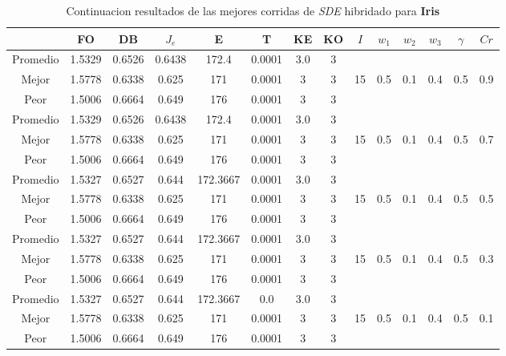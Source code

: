 \begin{table}[h!]
    \footnotesize
    \begin{center}
        \begin{tabular}{|c|c|c|c|c|c|c|c|c|c|c|c|c|c|}
        \hline
            & {\bf FO} & {\bf DB} & $J_e$ & {\bf E} & {\bf T} & {\bf KE} & {\bf KO} & $I$ & $w_1$ & $w_2$ & $w_3$ & $\gamma$ & $Cr$ \\
        \hline
        \hline
            Promedio  & 1.5329 & 0.6526 & 0.6438 & 172.4 & 0.0001 & 3.0 & 3 &  &  &  &  &  & \\
            \cline{1-8}
            Mejor & 1.5778 & 0.6338  & 0.625 & 171 & 0.0001 & 3 & 3 & 15 & 0.5 & 0.1 & 0.4 & 0.5 & 0.9\\
            \cline{1-8}
            Peor & 1.5006 & 0.6664  & 0.649 & 176 & 0.0001 & 3 & 3 &  &  &  &  &  & \\
        \hline
        \hline
            Promedio  & 1.5329 & 0.6526 & 0.6438 & 172.4 & 0.0001 & 3.0 & 3 &  &  &  &  &  & \\
            \cline{1-8}
            Mejor & 1.5778 & 0.6338  & 0.625 & 171 & 0.0001 & 3 & 3 & 15 & 0.5 & 0.1 & 0.4 & 0.5 & 0.7\\
            \cline{1-8}
            Peor & 1.5006 & 0.6664  & 0.649 & 176 & 0.0001 & 3 & 3 &  &  &  &  &  & \\
        \hline
        \hline
            Promedio  & 1.5327 & 0.6527 & 0.644 & 172.3667 & 0.0001 & 3.0 & 3 &  &  &  &  &  & \\
            \cline{1-8}
            Mejor & 1.5778 & 0.6338  & 0.625 & 171 & 0.0001 & 3 & 3 & 15 & 0.5 & 0.1 & 0.4 & 0.5 & 0.5\\
            \cline{1-8}
            Peor & 1.5006 & 0.6664  & 0.649 & 176 & 0.0001 & 3 & 3 &  &  &  &  &  & \\
        \hline
        \hline
            Promedio  & 1.5327 & 0.6527 & 0.644 & 172.3667 & 0.0001 & 3.0 & 3 &  &  &  &  &  & \\
            \cline{1-8}
            Mejor & 1.5778 & 0.6338  & 0.625 & 171 & 0.0001 & 3 & 3 & 15 & 0.5 & 0.1 & 0.4 & 0.5 & 0.3\\
            \cline{1-8}
            Peor & 1.5006 & 0.6664  & 0.649 & 176 & 0.0001 & 3 & 3 &  &  &  &  &  & \\
        \hline
        \hline
            Promedio  & 1.5327 & 0.6527 & 0.644 & 172.3667 & 0.0 & 3.0 & 3 &  &  &  &  &  & \\
            \cline{1-8}
            Mejor & 1.5778 & 0.6338  & 0.625 & 171 & 0.0001 & 3 & 3 & 15 & 0.5 & 0.1 & 0.4 & 0.5 & 0.1\\
            \cline{1-8}
            Peor & 1.5006 & 0.6664  & 0.649 & 176 & 0.0001 & 3 & 3 &  &  &  &  &  & \\
        \hline
        \end{tabular}
        \caption{Continuacion resultados de las mejores corridas de \emph{SDE} hibridado para {\bf Iris}}
        \label{tb:tablesdehibcsvc}
    \end{center}
\end{table}
